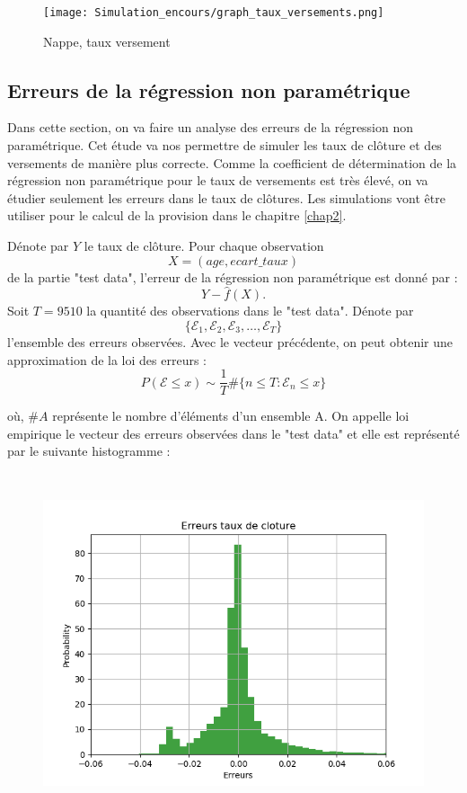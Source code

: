 \documentclass[12pt, a4paper]{book}
\begin{document}
\begin{figure}[!h]%
\label{nappe_veersement}
\centering
\texttt{[image: Simulation\_encours/graph\_taux\_versements.png]}
\caption{Nappe, taux versement }
\end{figure}


\subsection{Erreurs de la régression non paramétrique}

Dans cette section, on va faire un analyse des erreurs de la régression non paramétrique. Cet étude va nos permettre de simuler les taux de clôture et des versements de manière plus correcte. Comme la coefficient de détermination  de la régression non paramétrique pour le taux de versements est très élevé, on va étudier seulement les erreurs dans le taux de clôtures. Les simulations vont être utiliser pour le calcul de la provision dans le chapitre \ref{chap2}.

Dénote par $Y$ le taux de clôture. Pour chaque observation 
$$X = (age, ecart\_taux)$$ de la partie "test data", l'erreur de la régression non paramétrique est donné par :
$$ Y - \hat{f}(X).$$
Soit $T=9510$ la quantité des observations dans le "test data". Dénote par
$$ \{\mathcal{E}_1, \mathcal{E}_2,\mathcal{E}_3,\ldots, \mathcal{E}_T\}$$
l'ensemble des erreurs observées. 
Avec le vecteur précédente, on peut obtenir une approximation de la loi des erreurs :
$$P(\mathcal{E} \leq x) \sim \frac{1}{T}\#\{n\leq T : \mathcal{E}_n \leq x\}$$ 

où, $\#A$ représente le nombre d'éléments d'un ensemble A. On appelle loi empirique le vecteur des erreurs observées dans le "test data" et elle est représenté par le suivante histogramme :

\begin{figure}[!h]%
\label{E_cloture}
\centering
\includegraphics[height=10cm,width=16cm]{E_cloture.png}
\end{figure}
\end{document}

